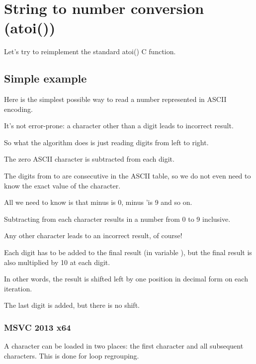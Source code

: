 \chapter{String to number conversion (atoi())}


Let's try to reimplement the standard atoi() C function.

\section{Simple example}

Here is the simplest possible way to read a number represented in \ac{ASCII} encoding.

It's not error-prone: a character other than a digit leads to incorrect result.



So what the algorithm does is just reading digits from left to right.

The zero \ac{ASCII} character is subtracted from each digit. 

The digits from  to  are consecutive in the \ac{ASCII} table, so 
we do not even need to know the exact value of the  character.

All we need to know is that  minus  is 0,  minus 'is 9 and so on.

Subtracting  from each character results in a number from 0 to 9 inclusive.

Any other character leads to an incorrect result, of course!

Each digit has to be added to the final result (in variable ), but the final result
is also multiplied by 10 at each digit.

In other words, the result is shifted left by one position in decimal form on each iteration.

The last digit is added, but there is no shift.

\subsection{\Optimizing MSVC 2013 x64}



A character can be loaded in two places: the first character and all subsequent characters.
This is done for loop regrouping.

